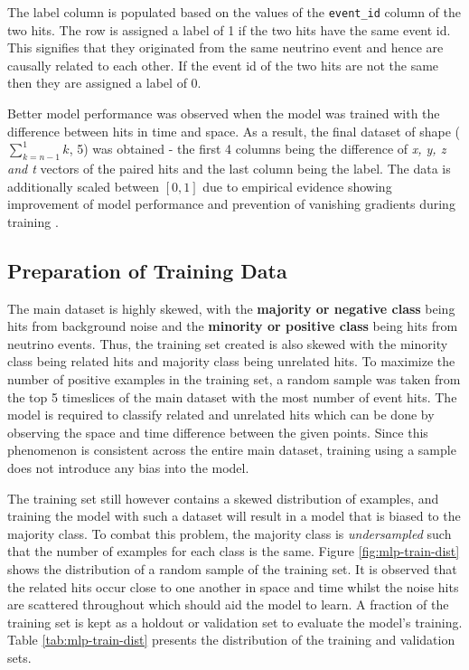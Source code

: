 The label column is populated based on the values of the
\texttt{event\_id} column of the two hits. The row is assigned a label
of 1 if the two hits have the same event id. This signifies that they
originated from the same neutrino event and hence are causally related
to each other. If the event id of the two hits are not the same then
they are assigned a label of 0.

Better model performance was observed when the model was trained with
the difference between hits in time and space. As a result, the final
dataset of shape ($\sum_{k=n-1}^{1}k$, 5) was obtained - the first 4
columns being the difference of \emph{x, y, z and t} vectors of the
paired hits and the last column being the label. The data is
additionally scaled between $[0,1]$ due to empirical evidence showing
improvement of model performance and prevention of vanishing gradients
during training \cite{bengio2012practical,goodfellow-et-al-2016}.

\subsection{Preparation of Training Data}
\label{sec:mlp-data-prep-train}

The main dataset is highly skewed, with the \textbf{majority or
  negative class} being hits from background noise and the
\textbf{minority or positive class} being hits from neutrino events.
Thus, the training set created is also skewed with the minority class
being related hits and majority class being unrelated hits. To
maximize the number of positive examples in the training set, a random
sample was taken from the top 5 timeslices of the main dataset with
the most number of event hits. The model is required to classify
related and unrelated hits which can be done by observing the space
and time difference between the given points. Since this phenomenon is
consistent across the entire main dataset, training using a sample
does not introduce any bias into the model.

The training set still however contains a skewed distribution of
examples, and training the model with such a dataset will result in a
model that is biased to the majority class. To combat this problem,
the majority class is \emph{undersampled} such that the number of
examples for each class is the same. Figure \ref{fig:mlp-train-dist}
shows the distribution of a random sample of the training set. It is
observed that the related hits occur close to one another in space and
time whilst the noise hits are scattered throughout which should aid
the model to learn. A fraction of the training set is kept as a
holdout or validation set to evaluate the model's training. Table
\ref{tab:mlp-train-dist} presents the distribution of the training and
validation sets.

